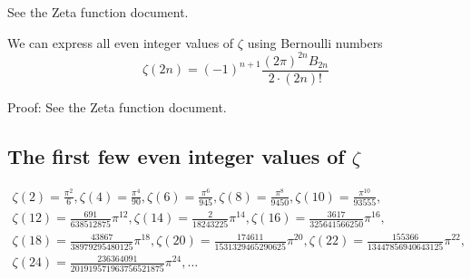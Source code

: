 \documentclass[a4paper]{article}
\begin{document}
    See the Zeta function document.

    \begin{theorem}
        We can express all even integer values of $\zeta$ using Bernoulli numbers
        \begin{equation}
            \label{eq:even-zeta}
            \zeta(2n) = (-1)^{n+1} \frac{(2\pi)^{2n} B_{2n}}{2 \cdot (2n)!}
        \end{equation}

        Proof:
        See the Zeta function document.
    \end{theorem}

    \subsection{The first few even integer values of $\zeta$}\label{subsec:the-first-few-even-integer-values-of-$zeta$}

    \begin{gather*}
        \zeta(2) = \frac{\pi^2}{6},
        \zeta(4) = \frac{\pi^4}{90},
        \zeta(6) = \frac{\pi^6}{945},
        \zeta(8) = \frac{\pi^8}{9450},
        \zeta(10) = \frac{\pi^{10}}{93555},
        \\
        \zeta(12) = \frac{691}{638512875} \pi^{12},
        \zeta(14) = \frac{2}{18243225} \pi^{14},
        \zeta(16) = \frac{3617}{325641566250} \pi^{16},
        \\
        \zeta(18) = \frac{43867}{38979295480125} \pi^{18},
        \zeta(20) = \frac{174611}{1531329465290625} \pi^{20},
        \zeta(22) = \frac{155366}{13447856940643125} \pi^{22},
        \\
        \zeta(24) = \frac{236364091}{201919571963756521875} \pi^{24},
        \dots
    \end{gather*}

    \pagebreak
\end{document}
